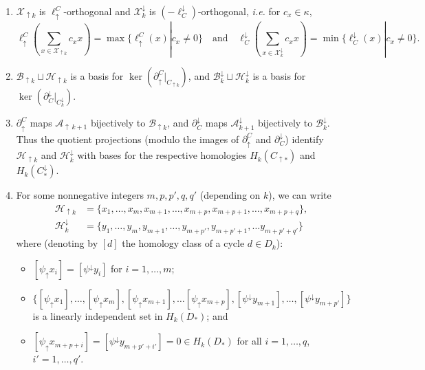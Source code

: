 \documentclass[11pt]{amsart}
\theoremstyle{definition}
\theoremstyle{remark}
\numberwithin{equation}{section}
\begin{document}
\begin{enumerate}
	\item \label{xbasis1} $\mathcal{X}_{\uparrow k}$ is $\ell_{\uparrow}^{C}$-orthogonal and $\mathcal{X}^{\downarrow}_{k}$ is $(-\ell^{\downarrow}_{C})$-orthogonal, \emph{i.e.} for $c_x\in \kappa$, \[ \ell_{\uparrow}^{C}\left(\sum_{x\in \mathcal{X}_{\uparrow k}}c_x x\right)=\max\{\ell_{\uparrow}^{C}(x)|c_x\neq 0\}\quad \mbox{and}\quad \ell^{\downarrow}_{C}\left(\sum_{x\in \mathcal{X}^{\downarrow}_{k}}c_xx\right)=\min\{\ell^{\downarrow}_{C}(x)|c_x\neq 0\}. \]
	\item \label{xbasis2} $\mathcal{B}_{\uparrow k}\sqcup \mathcal{H}_{\uparrow k}$ is a basis for $\ker(\partial_{\uparrow}^{C}|_{C_{\uparrow k}})$, and $\mathcal{B}^{\downarrow}_{k}\sqcup \mathcal{H}^{\downarrow}_{k}$ is a basis for $\ker(\partial^{\downarrow}_{C}|_{C^{\downarrow}_{k}})$.
	\item \label{xbasis3} $\partial_{\uparrow}^C$ maps $\mathcal{A}_{\uparrow\,k+1}$ bijectively to $\mathcal{B}_{\uparrow k}$, and $\partial^{\downarrow}_C$ maps $\mathcal{A}^{\downarrow}_{k+1}$ bijectively to $\mathcal{B}^{\downarrow}_{k}$.  Thus the quotient projections (modulo the images of $\partial^{C}_{\uparrow}$ and $\partial_{C}^{\downarrow}$) identify $\mathcal{H}_{\uparrow k}$ and $\mathcal{H}^{\downarrow}_{k}$ with bases for the respective homologies $H_k(C_{\uparrow *})$ and $H_k(C^{\downarrow}_{*})$.
	\item \label{xbasis4} For some nonnegative integers $m,p,p',q,q'$ (depending on  $k$), we can write \begin{align*} \mathcal{H}_{\uparrow k}&=\{x_1,\ldots,x_m,x_{m+1},\ldots,x_{m+p},x_{m+p+1},\ldots,x_{m+p+q}\},\\ \mathcal{H}^{\downarrow}_{k}&=\{y_1,\ldots,y_m,y_{m+1},\ldots,y_{m+p'},y_{m+p'+1},\ldots y_{m+p'+q'}\} \end{align*} where (denoting by $[d]$ the homology class of a cycle $d\in D_k$):
	\begin{itemize} \item[(i)] $[\psi_{\uparrow}x_i]=[\psi^{\downarrow}y_i]$ for $i=1,\ldots,m$;
		\item[(ii)] $\{[\psi_{\uparrow}x_1],\ldots,[\psi_{\uparrow}x_m],[\psi_{\uparrow}x_{m+1}],\ldots[\psi_{\uparrow}x_{m+p}],[\psi^{\downarrow}y_{m+1}],\ldots,[\psi^{\downarrow}y_{m+p'}]\}$ is a linearly independent set in $H_k(D_*)$; and 
		\item[(iii)] $[\psi_{\uparrow}x_{m+p+i}]=[\psi^{\downarrow}y_{m+p'+i'}]=0\in H_k(D_*)$ for all $i=1,\ldots,q$,\,$i'=1,\ldots,q'$. \end{itemize}
\end{enumerate}
\end{document}
